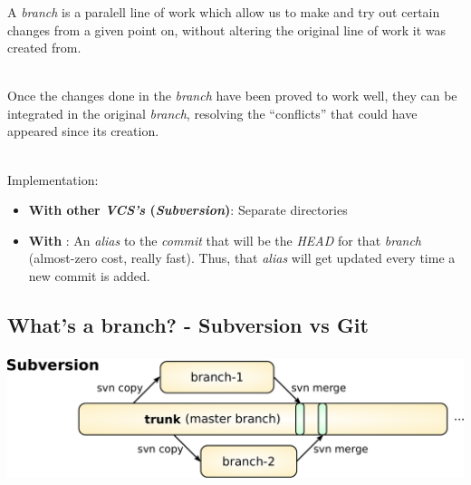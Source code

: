 \begin{frame}
  \frametitle{\insertsubsection}

  A \textit{branch} is a paralell line of work which allow us to make
  and try out certain changes from a given point on, without altering
  the original line of work it was created from.\pause
  \\ \ \vspacing

  Once the changes done in the \textit{branch} have been proved to
  work well, they can be integrated in the original \textit{branch},
  resolving the ``conflicts'' that could have appeared since its
  creation.\pause \\ \ \vspacing

  Implementation:
  \begin{itemize}
  \item \textbf{With other \textit{VCS's} (\textit{Subversion})}: Separate directories \vspacing

  \item \textbf{With \git}: An \textit{alias} to the \textit{commit}
    that will be the \textit{HEAD} for that \textit{branch}
    (almost-zero cost, really fast). Thus, that \textit{alias} will
    get updated every time a new commit is added.
  \end{itemize}
\end{frame}


\subsection{What's a branch? - Subversion vs Git}

\begin{frame}
  \frametitle{\insertsubsection}

  \begin{center}
    \includegraphics[width=1.0\textwidth]{images/pdf/svn-branches.pdf}
  \end{center}

  \begin{center}
  \end{center}
\end{frame}

